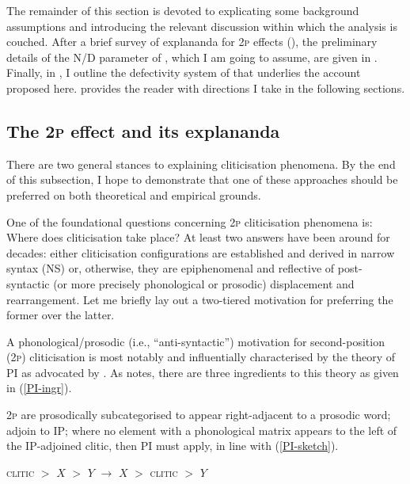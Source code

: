 \documentclass[output=paper]{langsci/langscibook}
\begin{document}
The remainder of this section is devoted to explicating some background
assumptions and introducing the relevant discussion within which the analysis
is couched. After a brief survey of explananda for \textsc{2p} effects
(), the preliminary details of the N/D parameter of
\citet{Boskovic:2005,Boskovic2008}, which I am going to assume, are given in
. Finally, in , I outline the defectivity
system of \citet{Roberts2010} that underlies the account proposed here.
 provides the reader with directions I take in the following
sections.

\subsection{The \textsc{2p} effect and its explananda}\label{subsec:2Peff}

There are two general stances to explaining cliticisation
phenomena. By the end of this subsection, I hope to demonstrate that one of
these approaches should be preferred on both theoretical and empirical grounds.

One of the foundational questions concerning \textsc{2p}
cliticisation phenomena is: Where does cliticisation
take place? At least two answers have been around for decades: either
cliticisation configurations are established and derived in narrow
syntax (NS) or, otherwise, they are epiphenomenal and reflective of
post-syntactic (or more precisely phonological or prosodic) displacement and
rearrangement. Let me briefly lay out a two-tiered motivation for preferring
the former over the latter.

A phonological/prosodic (i.e., ``anti-syntactic'') motivation for
second-position (\textsc{2p}) cliticisation is most notably and
influentially characterised by the theory of \gls{PI} as advocated by
\citet{Halpern:1992,halpern:1995dq}. As \citet[422]{roberts:2012uq} notes,
there are three ingredients to this theory as given in (\ref{PI-ingr}).

\begin{exe}
\ex
\begin{xlisti}
\ex \textsc{2p}  are prosodically subcategorised to appear right-ad\-ja\-cent to a prosodic word; \label{PI-i}
\ex {} adjoin to IP; \label{PI-ii}
\ex where no element with a phonological matrix appears to the left of the
IP-adjoined clitic, then \gls{PI} must apply, in line with (\ref{PI-sketch}).
\label{PI-iii}
\end{xlisti}
\label{PI-ingr}
\ex \textsc{clitic} $>$ $X$ $>$ $Y$ $\longrightarrow$  $X$ $>$ \textsc{clitic} $>$ $Y$

\label{PI-sketch}

\end{exe}
\end{document}
